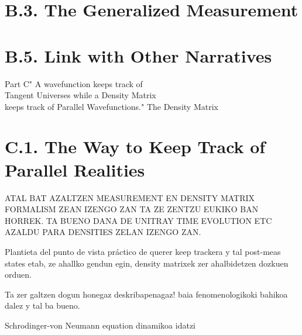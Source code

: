\documentclass[11pt, a4paper]{article} %
\begin{document}
\section*{B.3. The Generalized Measurement}

\section*{B.5. Link with Other Narratives}

\newpage



\newpage
\begin{kapituloBerria}{Part C}{" A wavefunction keeps track of\\ Tangent Universes while a Density Matrix\\ keeps track of Parallel Wavefunctions."}
The Density Matrix 
\end{kapituloBerria}
\newpage
\null
\fancyhead[L]{\null}
\fancyhead[R]{\null}
\clearpage


\section*{C.1. The Way to Keep Track of Parallel Realities}
ATAL BAT AZALTZEN MEASUREMENT EN DENSITY MATRIX FORMALISM ZEAN IZENGO ZAN TA ZE ZENTZU EUKIKO BAN HORREK. TA BUENO DANA DE UNITRAY TIME EVOLUTION ETC AZALDU PARA DENSITIES ZELAN IZENGO ZAN.

\iffalse
Plantieta del punto de vista práctico de querer keep trackera y tal post-meas states etab, ze ahallko gendun egin, density matrixek zer ahalbidetzen dozkuen orduen.

Ta zer galtzen dogun honegaz deskribapenagaz! baia fenomenologikoki bahikoa dalez y tal ba bueno.

Schrodinger-von Neumann equation dinamikoa idatzi
\end{document}
